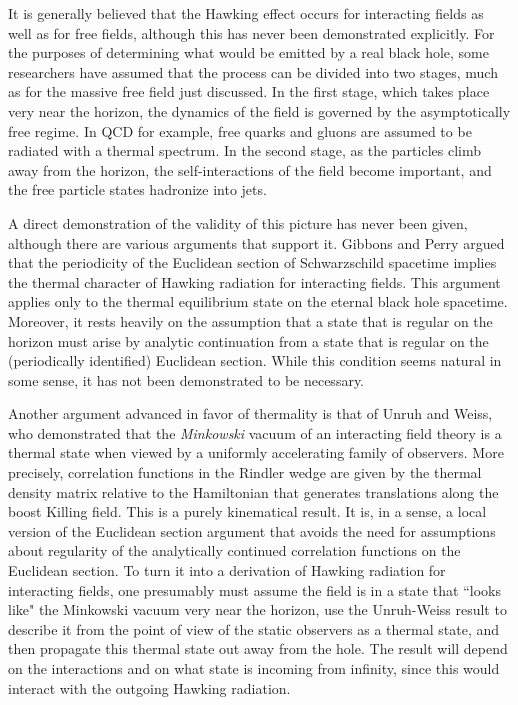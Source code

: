 It is generally believed that the Hawking effect occurs for
interacting fields as well as for free fields, although this
has never been demonstrated explicitly. For the purposes of
determining what would be emitted by a real black hole, some
researchers \cite{Halzen} have assumed that the process  can
be divided into two stages, much as for the massive free
field just discussed. In the first stage, which takes place
very near the horizon, the dynamics of the field is governed
by the asymptotically free regime. In QCD for
example, free quarks and gluons are assumed to be radiated
with a thermal spectrum. In the second stage, as the
particles climb away from the horizon, the self-interactions
of the field become important, and the free particle states
hadronize into jets.

A direct demonstration of the validity
of this picture has never been given, although there are
various arguments that support it. Gibbons and
Perry\cite{GibbPerry} argued that the periodicity of the
Euclidean section of Schwarzschild
spacetime implies the thermal character of Hawking radiation for
interacting fields. This argument
applies only to the thermal equilibrium state on the eternal
black hole spacetime. Moreover, it rests heavily on the
assumption that a state that is regular on the horizon must
arise by analytic continuation from a state that is regular
on the (periodically identified) Euclidean section. While
this condition seems natural in some sense, it has not been
demonstrated to be necessary.

Another argument advanced in favor of thermality is that of Unruh
and Weiss\cite{UnruhWeiss}, who demonstrated that the {\it Minkowski}
vacuum of an interacting field theory is a thermal state when
viewed by a uniformly accelerating family of observers. More
precisely, correlation functions in the Rindler wedge are given
by the thermal density matrix relative to the Hamiltonian that
generates translations along the boost Killing field.
This is a purely kinematical result. It is, in a sense, a
local version of the Euclidean section argument that avoids
the need for assumptions about regularity of the
analytically continued correlation functions on the
Euclidean section. To turn it into a derivation of Hawking
radiation for interacting fields, one presumably must assume
the field is in a state that ``looks like" the Minkowski vacuum
very near the horizon, use the Unruh-Weiss result to describe
it from the point of view of the static observers as a thermal
state, and then propagate this thermal state out away from
the hole. The result will depend on the interactions and on
what state is incoming from infinity, since this would interact
with the outgoing Hawking radiation.

